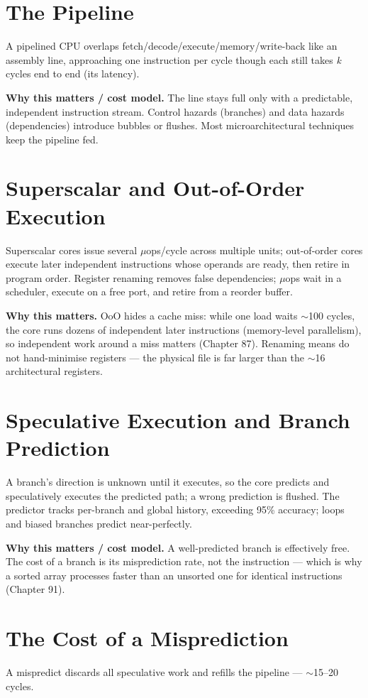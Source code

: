 \section{The Pipeline}
A pipelined CPU overlaps fetch/decode/execute/memory/write-back like an assembly line, approaching one instruction per cycle though each still takes \emph{k} cycles end to end (its latency).

\textbf{Why this matters / cost model.} The line stays full only with a predictable, independent instruction stream. Control hazards (branches) and data hazards (dependencies) introduce bubbles or flushes. Most microarchitectural techniques keep the pipeline fed.

\section{Superscalar and Out-of-Order Execution}
Superscalar cores issue several \(\mu\)ops/cycle across multiple units; out-of-order cores execute later independent instructions whose operands are ready, then retire in program order. Register renaming removes false dependencies; \(\mu\)ops wait in a scheduler, execute on a free port, and retire from a reorder buffer.

\textbf{Why this matters.} OoO hides a cache miss: while one load waits $\sim$100 cycles, the core runs dozens of independent later instructions (memory-level parallelism), so independent work around a miss matters (Chapter 87). Renaming means do not hand-minimise registers --- the physical file is far larger than the $\sim$16 architectural registers.

\section{Speculative Execution and Branch Prediction}
A branch's direction is unknown until it executes, so the core predicts and speculatively executes the predicted path; a wrong prediction is flushed. The predictor tracks per-branch and global history, exceeding 95\% accuracy; loops and biased branches predict near-perfectly.

\textbf{Why this matters / cost model.} A well-predicted branch is effectively free. The cost of a branch is its misprediction rate, not the instruction --- which is why a sorted array processes faster than an unsorted one for identical instructions (Chapter 91).

\section{The Cost of a Misprediction}
A mispredict discards all speculative work and refills the pipeline --- $\sim$15--20 cycles.


